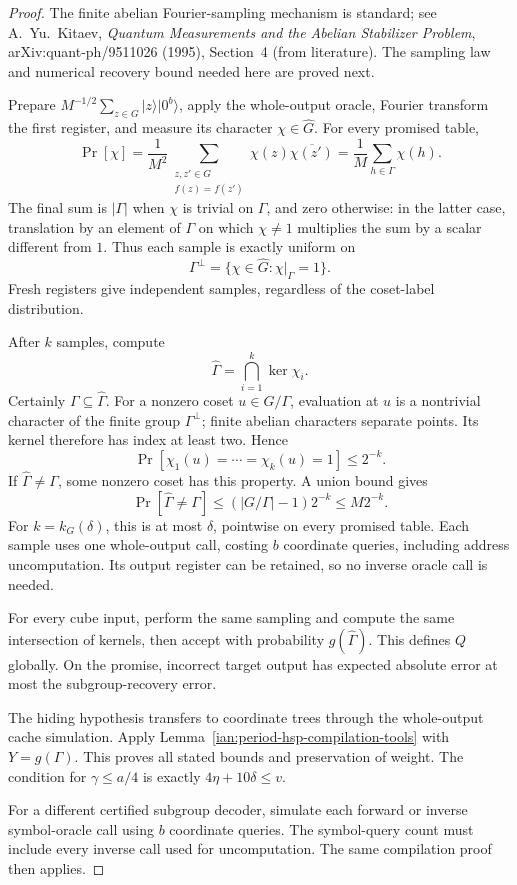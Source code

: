 \begin{proof}
The finite abelian Fourier-sampling mechanism is standard; see
A.~Yu.~Kitaev, \emph{Quantum Measurements and the Abelian Stabilizer Problem},
arXiv:quant-ph/9511026 (1995), Section~4 (from literature).
The sampling law and numerical recovery bound needed here are proved next.

Prepare \(M^{-1/2}\sum_{z\in G}|z\rangle|0^b\rangle\), apply the whole-output oracle, Fourier transform the first register, and measure its character \(\chi\in\widehat G\).
For every promised table,
\[
 \Pr[\chi]
 =
 \frac1{M^2}
 \sum_{\substack{z,z'\in G\\f(z)=f(z')}}
 \chi(z)\overline{\chi(z')}
 =
 \frac1M\sum_{h\in\Gamma}\chi(h).
\]
The final sum is \(|\Gamma|\) when \(\chi\) is trivial on \(\Gamma\), and zero otherwise: in the latter case, translation by an element of \(\Gamma\) on which \(\chi\ne1\) multiplies the sum by a scalar different from \(1\).
Thus each sample is exactly uniform on
\[
 \Gamma^\perp=\{\chi\in\widehat G:\chi|_\Gamma=1\}.
\]
Fresh registers give independent samples, regardless of the coset-label distribution.

After \(k\) samples, compute
\[
 \widehat\Gamma=\bigcap_{i=1}^k\ker\chi_i.
\]
Certainly \(\Gamma\subseteq\widehat\Gamma\).
For a nonzero coset \(u\in G/\Gamma\), evaluation at \(u\) is a nontrivial character of the finite group \(\Gamma^\perp\); finite abelian characters separate points. Its kernel therefore has index at least two. Hence
\[
 \Pr[\chi_1(u)=\cdots=\chi_k(u)=1]\le2^{-k}.
\]
If \(\widehat\Gamma\ne\Gamma\), some nonzero coset has this property. A union bound gives
\[
 \Pr[\widehat\Gamma\ne\Gamma]
 \le (|G/\Gamma|-1)2^{-k}
 \le M2^{-k}.
\]
For \(k=k_G(\delta)\), this is at most \(\delta\), pointwise on every promised table. Each sample uses one whole-output call, costing \(b\) coordinate queries, including address uncomputation. Its output register can be retained, so no inverse oracle call is needed.

For every cube input, perform the same sampling and compute the same intersection of kernels, then accept with probability \(g(\widehat\Gamma)\). This defines \(Q\) globally. On the promise, incorrect target output has expected absolute error at most the subgroup-recovery error.

The hiding hypothesis transfers to coordinate trees through the whole-output cache simulation. Apply Lemma~\ref{ian:period-hsp-compilation-tools} with \(Y=g(\Gamma)\). This proves all stated bounds and preservation of weight. The condition for \(\gamma\le a/4\) is exactly
\(4\eta+10\delta\le v\).

For a different certified subgroup decoder, simulate each forward or inverse symbol-oracle call using \(b\) coordinate queries. The symbol-query count must include every inverse call used for uncomputation. The same compilation proof then applies.
\end{proof}

